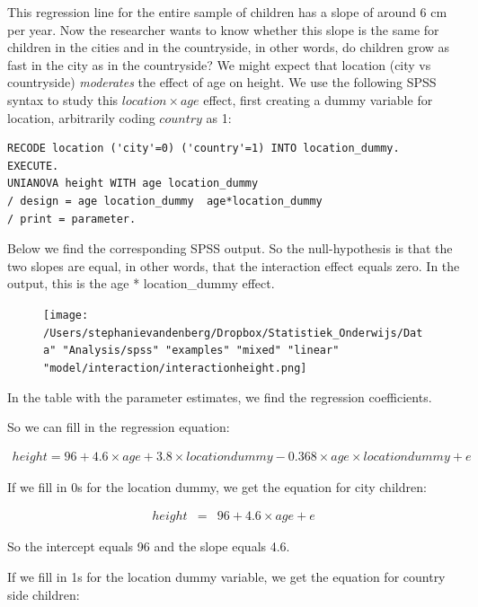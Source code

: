 \documentclass[]{report}\usepackage[]{graphicx}\usepackage[]{color}
\begin{document}
This regression line for the entire sample of children has a slope of around 6 cm per year. Now the researcher wants to know whether this slope is the same for children in the cities and in the countryside, in other words, do children grow as fast in the city as in the countryside? We might expect that location (city vs countryside) \textit{moderates} the effect of age on height. We use the following SPSS syntax to study this $location \times age$ effect, first creating a dummy variable for location, arbitrarily coding $country$ as 1:
\begin{verbatim}
RECODE location ('city'=0) ('country'=1) INTO location_dummy.
EXECUTE.
UNIANOVA height WITH age location_dummy 
/ design = age location_dummy  age*location_dummy
/ print = parameter.
\end{verbatim}
Below we find the corresponding SPSS output. So the null-hypothesis is that the two slopes are equal, in other words, that the interaction effect equals zero. In the output, this is the age * location\_dummy effect.


\begin{figure}[h]
    \begin{center}
       \texttt{[image: /Users/stephanievandenberg/Dropbox/Statistiek\_Onderwijs/Data" "Analysis/spss" "examples" "mixed" "linear" "model/interaction/interactionheight.png]}
    \end{center}
\end{figure}




In the table with the parameter estimates, we find the regression coefficients. 

So we can fill in the regression equation:

\begin{eqnarray} 
height = 96 + 4.6 \times age + 3.8  \times locationdummy - 0.368 \times  age \times locationdummy + e \nonumber
\end{eqnarray}


If we fill in 0s for the location dummy, we get the equation for city children:

\begin{eqnarray} 
height &=& 96 + 4.6  \times age  + e  \nonumber
 \end{eqnarray}

So the intercept equals 96 and the slope equals 4.6.

If we fill in 1s for the location dummy variable, we get the equation for country side children:
\end{document}
